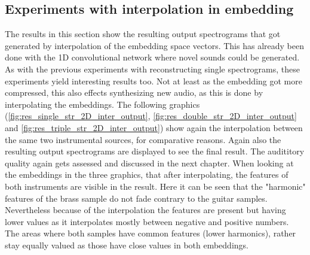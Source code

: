 \subsection{Experiments with interpolation in embedding}
The results in this section show the resulting output spectrograms that got generated by interpolation of the embedding space vectors. This has already been done with the 1D convolutional network where novel sounds could be generated. As with the previous experiments with reconstructing single spectrograms, these experiments yield interesting results too. Not at least as the embedding got more compressed, this also effects synthesizing new audio, as this is done by interpolating the embeddings. The following graphics (\ref{fig:res_single_str_2D_inter_output}, \ref{fig:res_double_str_2D_inter_output} and \ref{fig:res_triple_str_2D_inter_output}) show again the interpolation between the same two instrumental sources, for comparative reasons. Again also the resulting output spectrograms are displayed to see the final result. The audititory quality again gets assessed and discussed in the next chapter.
When looking at the embeddings in the three graphics, that after interpolating, the features of both instruments are visible in the result. Here it can be seen that the "harmonic" features of the brass sample do not fade contrary to the guitar samples. Nevertheless because of the interpolation the features are present but having lower values as it interpolates mostly between negative and positive numbers.  The areas where both samples have common features (lower harmonics), rather stay equally valued as those have close values in both embeddings. 

